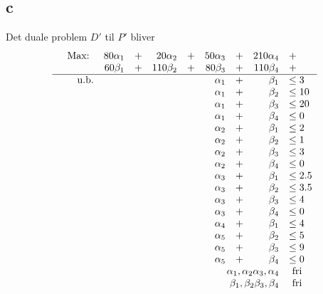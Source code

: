\documentclass[a4paper]{article}
\begin{document}
\subsection*{c}
Det duale problem $D'$ til $P'$ bliver
\begin{equation}
\begin{array}{rrrrrrrrrl}
&\text{Max: } & 80\alpha_1 & + & 20\alpha_2 & + & 50\alpha_3 & + & 210\alpha_4 & + \\
& & 60\beta_1 & + & 110\beta_2 & + & 80\beta_3 & + & 110\beta_4 & + \\
\hline
&\text{u.b.} & & & & & \alpha_1 & + & \beta_1 & \leq 3 \\
& & & & & & \alpha_1 & + & \beta_2 & \leq 10 \\
& & & & & & \alpha_1 & + & \beta_3 & \leq 20 \\
& & & & & & \alpha_1 & + & \beta_4 & \leq 0 \\
& & & & & & \alpha_2 & + & \beta_1 & \leq 2 \\
& & & & & & \alpha_2 & + & \beta_2 & \leq 1 \\
& & & & & & \alpha_2 & + & \beta_3 & \leq 3 \\
& & & & & & \alpha_2 & + & \beta_4 & \leq 0 \\
& & & & & & \alpha_3 & + & \beta_1 & \leq 2.5 \\
& & & & & & \alpha_3 & + & \beta_2 & \leq 3.5 \\
& & & & & & \alpha_3 & + & \beta_3 & \leq 4 \\
& & & & & & \alpha_3 & + & \beta_4 & \leq 0 \\
& & & & & & \alpha_4 & + & \beta_1 & \leq 4 \\
& & & & & & \alpha_5 & + & \beta_2 & \leq 5 \\
& & & & & & \alpha_5 & + & \beta_3 & \leq 9 \\
& & & & & & \alpha_5 & + & \beta_4 & \leq 0 \\
\multicolumn{9}{r} {\alpha_1,\alpha_2\alpha_3,\alpha_4} &\mbox{ fri} \\
\multicolumn{9}{r} {\beta_1,\beta_2\beta_3,\beta_4} &\mbox{ fri} \\
\end{array}
\end{equation}

\newpage
\end{document}
